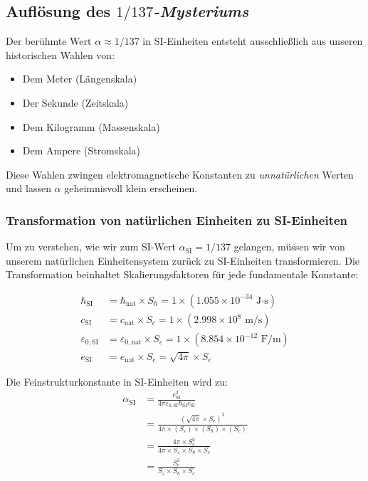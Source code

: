 	\subsection{Auflösung des \textit{$1/137$-Mysteriums}}
	
	Der berühmte Wert $\alpha \approx 1/137$ in SI-Einheiten entsteht ausschließlich aus unseren historischen Wahlen von:
	\begin{itemize}
		\item Dem Meter (Längenskala)
		\item Der Sekunde (Zeitskala)  
		\item Dem Kilogramm (Massenskala)
		\item Dem Ampere (Stromskala)
	\end{itemize}
	
	Diese Wahlen zwingen elektromagnetische Konstanten zu \textit{unnatürlichen} Werten und lassen $\alpha$ geheimnisvoll klein erscheinen.
	
	\subsubsection{Transformation von natürlichen Einheiten zu SI-Einheiten}
	
	Um zu verstehen, wie wir zum SI-Wert $\alpha_{\text{SI}} = 1/137$ gelangen, müssen wir von unserem natürlichen Einheitensystem zurück zu SI-Einheiten transformieren. Die Transformation beinhaltet Skalierungsfaktoren für jede fundamentale Konstante:
	
	\begin{align}
		\hbar_{\text{SI}} &= \hbar_{\text{nat}} \times S_{\hbar} = 1 \times (1.055 \times 10^{-34} \text{ J·s})\\
		c_{\text{SI}} &= c_{\text{nat}} \times S_c = 1 \times (2.998 \times 10^8 \text{ m/s})\\
		\varepsilon_{0,\text{SI}} &= \varepsilon_{0,\text{nat}} \times S_{\varepsilon} = 1 \times (8.854 \times 10^{-12} \text{ F/m})\\
		e_{\text{SI}} &= e_{\text{nat}} \times S_e = \sqrt{4\pi} \times S_e
	\end{align}
	
	Die Feinstrukturkonstante in SI-Einheiten wird zu:
	\begin{align}
		\alpha_{\text{SI}} &= \frac{e_{\text{SI}}^2}{4\pi\varepsilon_{0,\text{SI}}\hbar_{\text{SI}} c_{\text{SI}}}\\
		&= \frac{(\sqrt{4\pi} \times S_e)^2}{4\pi \times (S_{\varepsilon}) \times (S_{\hbar}) \times (S_c)}\\
		&= \frac{4\pi \times S_e^2}{4\pi \times S_{\varepsilon} \times S_{\hbar} \times S_c}\\
		&= \frac{S_e^2}{S_{\varepsilon} \times S_{\hbar} \times S_c}
	\end{align}
	
